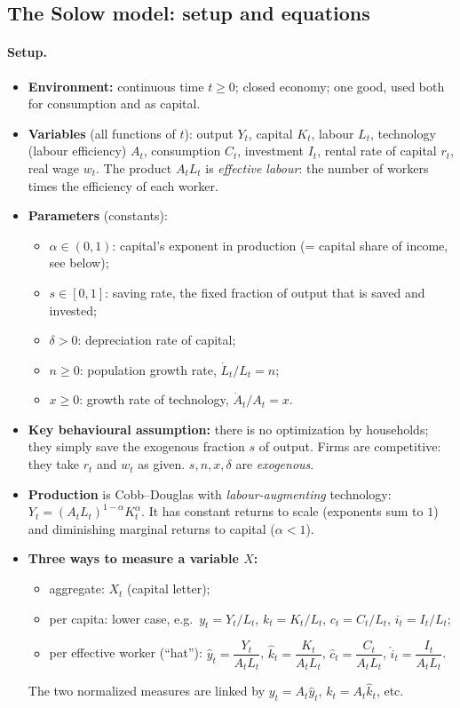 \subsection{The Solow model: setup and equations }

\paragraph{Setup.}
\begin{itemize}
  \item \textbf{Environment:} continuous time $t\ge 0$; closed economy; one good, used both for consumption and as capital.
  \item \textbf{Variables} (all functions of $t$): output $Y_t$, capital $K_t$, labour $L_t$, technology (labour efficiency) $A_t$, consumption $C_t$, investment $I_t$, rental rate of capital $r_t$, real wage $w_t$. The product $A_tL_t$ is \emph{effective labour}: the number of workers times the efficiency of each worker.
  \item \textbf{Parameters} (constants):
  \begin{itemize}
    \item $\alpha\in(0,1)$: capital's exponent in production (= capital share of income, see below);
    \item $s\in[0,1]$: saving rate, the fixed fraction of output that is saved and invested;
    \item $\delta>0$: depreciation rate of capital;
    \item $n\ge 0$: population growth rate, $\dot L_t/L_t = n$;
    \item $x\ge 0$: growth rate of technology, $\dot A_t/A_t = x$.
  \end{itemize}
  \item \textbf{Key behavioural assumption:} there is no optimization by households; they simply save the exogenous fraction $s$ of output. Firms are competitive: they take $r_t$ and $w_t$ as given. $s,n,x,\delta$ are \emph{exogenous}.
  \item \textbf{Production} is Cobb--Douglas with \emph{labour-augmenting} technology: $Y_t=(A_tL_t)^{1-\alpha}K_t^{\alpha}$. It has constant returns to scale (exponents sum to $1$) and diminishing marginal returns to capital ($\alpha<1$).
  \item \textbf{Three ways to measure a variable $X$:}
  \begin{itemize}
    \item aggregate: $X_t$ (capital letter);
    \item per capita: lower case, e.g.\ $y_t = Y_t/L_t$, $k_t=K_t/L_t$, $c_t=C_t/L_t$, $i_t = I_t/L_t$;
    \item per effective worker (``hat''): $\hat y_t = \dfrac{Y_t}{A_tL_t}$, $\hat k_t = \dfrac{K_t}{A_tL_t}$, $\hat c_t = \dfrac{C_t}{A_tL_t}$, $\hat i_t = \dfrac{I_t}{A_tL_t}$.
  \end{itemize}
  The two normalized measures are linked by $y_t = A_t\hat y_t$, $k_t = A_t\hat k_t$, etc.
\end{itemize}

